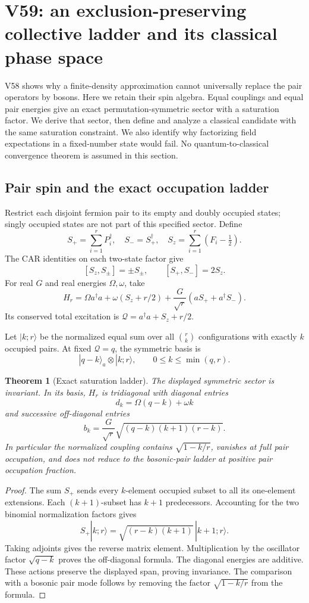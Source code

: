 \documentclass[11pt]{article}
\newtheorem{theorem}{Theorem}[section]
\theoremstyle{remark}
\begin{document}
\section{V59: an exclusion-preserving collective ladder and its classical phase space}
\label{sec:v20v59}

V58 shows why a finite-density approximation cannot universally
replace the pair operators by bosons.  Here we retain their
spin algebra.  Equal couplings and equal pair energies give
an exact permutation-symmetric sector with a saturation factor.
We derive that sector, then define and analyze a classical
candidate with the same saturation constraint.  We also identify
why factorizing field expectations in a fixed-number state
would fail.  No quantum-to-classical convergence theorem is
assumed in this section.

\subsection{Pair spin and the exact occupation ladder}

Restrict each disjoint fermion pair to its empty and doubly
occupied states; singly occupied states are not part of this
specified sector.  Define
\[
 S_+=\sum_{i=1}^rP_i^\dagger,\quad S_-=S_+^\dagger,\quad
 S_z=\sum_{i=1}^r(F_i-\tfrac12).
\]
The CAR identities on each two-state factor give
\[
 [S_z,S_\pm]=\pm S_\pm,\qquad [S_+,S_-]=2S_z.
\]
For real \(G\) and real energies \(\Omega,\omega\), take
\[
 H_r=\Omega a^\dagger a+\omega(S_z+r/2)
            +\frac{G}{\sqrt r}(aS_++a^\dagger S_-).
\]
Its conserved total excitation is
\(\mathcal Q=a^\dagger a+S_z+r/2\).

Let \(|k;r\rangle\) be the normalized equal sum over all
\(\binom rk\) configurations with exactly \(k\) occupied pairs.
At fixed \(\mathcal Q=q\), the symmetric basis is
\[
 |q-k\rangle_a\otimes|k;r\rangle,
              \qquad 0\leq k\leq\min(q,r).
\]

\begin{theorem}[Exact saturation ladder]
\label{thm:v20v59-ladder}
The displayed symmetric sector is invariant.  In its basis,
\(H_r\) is tridiagonal with diagonal entries
\[
 d_k=\Omega(q-k)+\omega k
\]
and successive off-diagonal entries
\[
 b_k=\frac{G}{\sqrt r}
           \sqrt{(q-k)(k+1)(r-k)}.
\]
In particular the normalized coupling contains
\(\sqrt{1-k/r}\), vanishes at full pair occupation, and
does not reduce to the bosonic-pair ladder at positive
pair occupation fraction.
\end{theorem}
\begin{proof}
The sum \(S_+\) sends every \(k\)-element occupied subset
to all its one-element extensions.  Each \((k+1)\)-subset
has \(k+1\) predecessors.  Accounting for the two
binomial normalization factors gives
\[
 S_+|k;r\rangle=\sqrt{(r-k)(k+1)}\,|k+1;r\rangle.
\]
Taking adjoints gives the reverse matrix element.
Multiplication by the oscillator factor \(\sqrt{q-k}\)
proves the off-diagonal formula.  The diagonal energies
are additive.  These actions preserve the displayed span,
proving invariance.  The comparison with a bosonic pair
mode follows by removing the factor \(\sqrt{1-k/r}\)
from the formula.
\end{proof}
\end{document}
